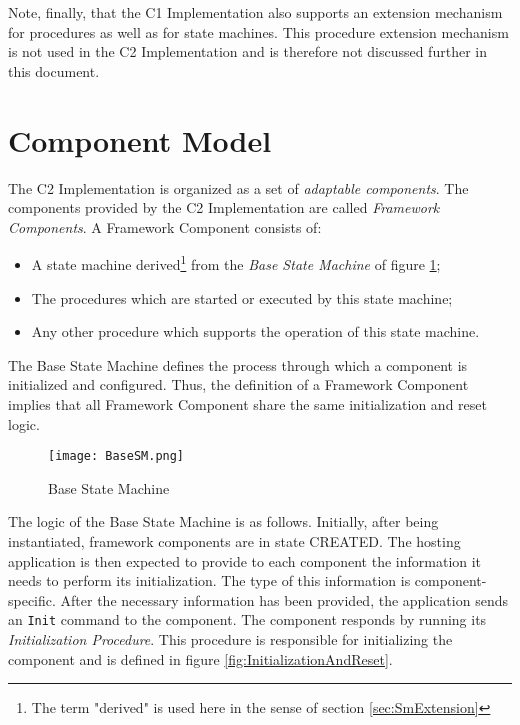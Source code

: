 \documentclass{pnp_article}
\begin{document}
Note, finally, that the C1 Implementation also supports an extension mechanism for procedures as well as for state machines. This procedure extension mechanism is not used in the C2 Implementation and is therefore not discussed further in this document. 

\section{Component Model}\label{sec:CmpModel}\label{sec:BaseCmp}
The C2 Implementation is organized as a set of \textit{adaptable components}. The components provided by the C2 Implementation are called \textit{Framework Components}. A Framework Component consists of:

\begin{itemize}
\item A state machine derived\footnote{The term "derived" is used here in the sense of section \ref{sec:SmExtension}} from the \textit{Base State Machine} of figure \ref{fig:BaseSM};
\item The procedures which are started or executed by this state machine;
\item Any other procedure which supports the operation of this state machine.
\end{itemize}

The Base State Machine defines the process through which a component is initialized and configured. Thus, the definition of a Framework Component implies that all Framework Component share the same initialization and reset logic. 

\begin{figure}[h]
 \centering
 \texttt{[image: BaseSM.png]}
 \caption{Base State Machine}
 \label{fig:BaseSM}
\end{figure}

The logic of the Base State Machine is as follows. Initially, after being instantiated, framework components are in state CREATED. The hosting application is then expected to provide to each component the information it needs to perform its initialization. The type of this information is component-specific. After the necessary information has been provided, the application sends an \texttt{Init} command to the component. The component responds by running its \textit{Initialization Procedure}. This procedure is responsible for initializing the component and is defined in figure \ref{fig:InitializationAndReset}. 
\end{document}
